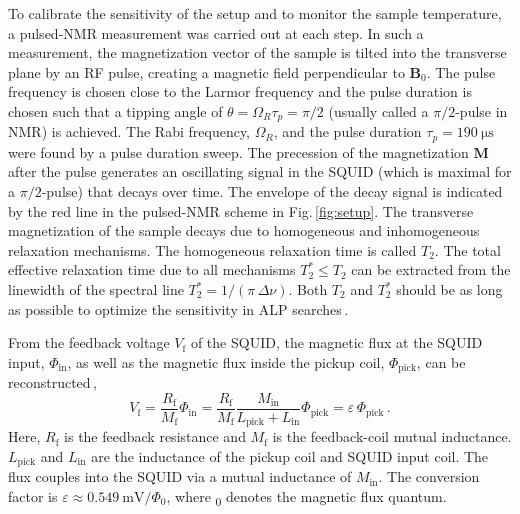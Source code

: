 \documentclass[superscriptaddress,
floatfix,
reprint,
nofootinbib,
amsmath,amssymb,
aps,
prd,
]{revtex4-2}
\begin{document}
To calibrate the sensitivity of the setup and to monitor the sample temperature, a pulsed-NMR measurement was carried out at each step. In such a measurement, the magnetization vector of the sample is tilted into the transverse plane by an RF pulse, creating a magnetic field perpendicular to $\mathbf{B}_0$. 
The pulse frequency is chosen close to the Larmor frequency and the pulse duration is chosen such that a tipping angle of $\theta = \Omega_R\tau_p = \pi/2$ (usually called a $\pi/2$-pulse in NMR) is achieved. 
The Rabi frequency, $\Omega_R$, and the pulse duration $\tau_p=\SI{190}{\micro\s}$ were found by a pulse duration sweep.
The precession of the magnetization $\mathbf{M}$ after the pulse generates an oscillating signal in the SQUID (which is maximal for a $\pi/2$-pulse) that decays over time. 
The envelope of the decay signal is indicated by the red line in the pulsed-NMR scheme in Fig.\,\ref{fig:setup}. 
The transverse magnetization of the sample decays due to homogeneous and inhomogeneous relaxation mechanisms. 
The homogeneous relaxation time is called $T_2$. 
The total effective relaxation time due to all mechanisms $T_2^*\le T_2$ can be extracted from the linewidth of the spectral line $T_2^*=1/(\pi\,\Delta\nu)$. Both $T_2$ and $T_2^*$ should be as long as possible to optimize the sensitivity in ALP searches\,\cite{Yuzhe2023_FrequencyScanning}. 

From the feedback voltage $V_\mathrm{f}$ of the SQUID, the magnetic flux at the SQUID input, $\Phi_{\mathrm{in}}$, as well as the magnetic flux inside the pickup coil, $\Phi_{\mathrm{pick}}$, can be reconstructed\,\cite{clarke2006squid}, 
\begin{equation}\label{eq:squidpickup}
    V_\mathrm{f}
    = \frac{R_\mathrm{f}}{M_\mathrm{f}} \Phi_{\mathrm{in}}
    = \frac{R_\mathrm{f}}{M_\mathrm{f}} \frac{M_\mathrm{in}}{L_{\mathrm{pick}}+L_{\mathrm{in}}} \Phi_{\mathrm{pick}}
    = \varepsilon\,\Phi_{\mathrm{pick}}\,.
\end{equation}
Here, $R_\mathrm{f}$ is the feedback resistance and $M_\mathrm{f}$ is the feedback-coil mutual inductance. 
$L_{\mathrm{pick}}$ and $L_{\mathrm{in}}$ are the inductance of the pickup coil and SQUID input coil. 
The flux couples into the SQUID via a mutual inductance of $M_\mathrm{in}$.
The conversion factor is $\varepsilon \approx \SI{0.549}{\milli\volt/\Phi_0}$, where \unit{\Phi_0} denotes the magnetic flux quantum.
\end{document}
